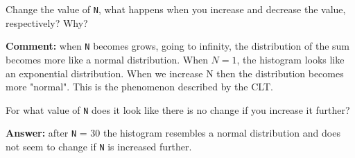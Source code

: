 \documentclass[letterpaper,12pt]{article}
\begin{document}
Change the value of  \texttt{N}, what happens when you increase and decrease the value, respectively? Why?\\

\begin{tcolorbox}
\textbf{Comment:}
when \texttt{N} becomes grows, going to infinity, the distribution of the sum becomes more like a normal distribution. When $N = 1$, the histogram looks like an exponential distribution. When we increase N then the distribution becomes more "normal". This is the phenomenon described by the CLT. 
\end{tcolorbox}

\begin{figure}
    \quad
    \label{fig:example}
\end{figure}

For what value of \texttt{N} does it look like there is no change if you increase it further?\\

\begin{tcolorbox}
\textbf{Answer:}
after \texttt{N} = 30 the histogram resembles a normal distribution and does not seem to change if \texttt{N} is increased further.
\end{tcolorbox}
\end{document}
